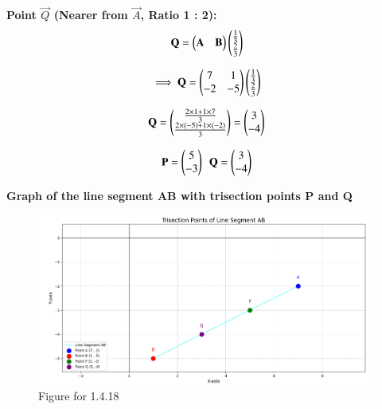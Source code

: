 \documentclass{beamer}
\begin{document}
\begin{frame}
\textbf{Point \( \vec{Q} \) (Nearer from \( \vec{A} \), Ratio 1 : 2):}
\begin{align}   
\vec{Q} = \begin{myvec}{\vec{A}& \vec{B}}\end{myvec}\begin{myvec}
        {\frac{1}{3}\\\frac{2}{3}}\end{myvec}    
\end{align}       

\begin{align}
\implies \vec{Q}=\begin{myvec}{ 7 & 1\\ -2 & -5 }\end{myvec}\begin{myvec}
        {\frac{1}{3}\\\frac{2}{3}}\end{myvec}\\
\end{align}


\begin{align}
\vec{Q} = \begin{myvec}{
\frac{2 \times 1 + 1 \times 7}{3} \\
\frac{2 \times (-5) + 1 \times (-2)}{3}
}\end{myvec}= \begin{myvec}{ 3 \\ -4 }\end{myvec}
\end{align}

\begin{align}
\mathbf{P}=\begin{pmatrix}5\\-3\end{pmatrix}\ \  \mathbf{Q}=\begin{pmatrix}3\\-4\end{pmatrix}
\end{align}    
\end{frame}

\begin{frame}
    \vspace{5em}
\textbf{Graph of the line segment AB with trisection points P and Q}
\begin{figure}[H]
    \centering
    \includegraphics[width=0.75\columnwidth]{figs/fig1.png}
    \caption{Figure for 1.4.18}
    \label{fig1}
\end{figure}
\end{frame}
\end{document}
